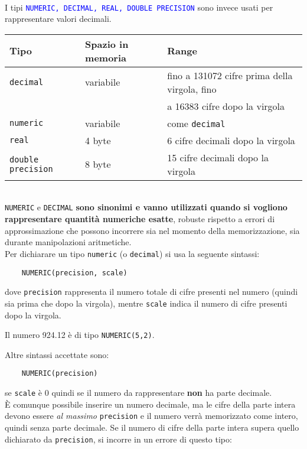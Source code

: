 \documentclass[12pt,a4paper]{book}
\begin{document}
	\paragraph{}I tipi \textcolor{blue}{\texttt{NUMERIC, DECIMAL, REAL, DOUBLE PRECISION}} sono invece usati per rappresentare valori decimali.\vspace{10px}\\
	\begin{tabular}{| l | l | l |}
		\hline
		Tipo & Spazio in memoria & Range\\
		\hline
		\texttt{decimal} & variabile & fino a 131072 cifre prima della virgola, fino\\ & & a 16383 cifre dopo la virgola\\
		\texttt{numeric} & variabile & come \texttt{decimal} \\
		\texttt{real} & 4 byte & 6 cifre decimali dopo la virgola\\
		\texttt{double precision} & 8 byte & 15 cifre decimali dopo la virgola\\
		\hline
	\end{tabular}\vspace{10px}\\
	\texttt{NUMERIC} e \texttt{DECIMAL} \textbf{sono sinonimi e vanno utilizzati quando si vogliono rappresentare quantità numeriche esatte}, robuste rispetto a errori di approssimazione che possono incorrere sia nel momento della memorizzazione, sia durante manipolazioni aritmetiche.\\
	Per dichiarare un tipo \texttt{numeric} (o \texttt{decimal}) si usa la seguente sintassi:
	\begin{lstlisting}
	NUMERIC(precision, scale)
	\end{lstlisting}
	dove \texttt{precision} rappresenta il numero totale di cifre presenti nel numero (quindi sia prima che dopo la virgola), mentre \texttt{scale} indica il numero di cifre presenti dopo la virgola.
	\begin{tcolorbox}[enhanced jigsaw, breakable,title=Esempio, title filled]
		Il numero 924.12 è di tipo \texttt{NUMERIC(5,2)}.
	\end{tcolorbox}
	Altre sintassi accettate sono:
	\begin{lstlisting}
	NUMERIC(precision)
	\end{lstlisting}
	se \texttt{scale} è 0 quindi se il numero da rappresentare \textbf{non} ha parte decimale. \\È comunque possibile inserire un numero decimale, ma le cifre della parte intera devono essere \textit{al massimo} \texttt{precision} e il numero verrà memorizzato come intero, quindi senza parte decimale. Se il numero di cifre della parte intera supera quello dichiarato da \texttt{precision}, si incorre in un errore di questo tipo:
\end{document}
